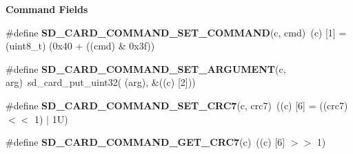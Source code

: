 \begin{Indent}\textbf{ Command Fields}\par
\begin{DoxyCompactItemize}
\item 
\mbox{\label{spi-sd-card_8c_af026546f270572d99efe2a6281298aaf}} 
\#define {\bfseries S\+D\+\_\+\+C\+A\+R\+D\+\_\+\+C\+O\+M\+M\+A\+N\+D\+\_\+\+S\+E\+T\+\_\+\+C\+O\+M\+M\+A\+ND}(c,  cmd)~(c) \mbox{[}1\mbox{]} = (uint8\+\_\+t) (0x40 + ((cmd) \& 0x3f))
\item 
\mbox{\label{spi-sd-card_8c_a805da41615ddd44bf9e5d8023276c313}} 
\#define {\bfseries S\+D\+\_\+\+C\+A\+R\+D\+\_\+\+C\+O\+M\+M\+A\+N\+D\+\_\+\+S\+E\+T\+\_\+\+A\+R\+G\+U\+M\+E\+NT}(c,  arg)~sd\+\_\+card\+\_\+put\+\_\+uint32( (arg), \&((c) \mbox{[}2\mbox{]}))
\item 
\mbox{\label{spi-sd-card_8c_add08712f7489870b770142c9b6c1c761}} 
\#define {\bfseries S\+D\+\_\+\+C\+A\+R\+D\+\_\+\+C\+O\+M\+M\+A\+N\+D\+\_\+\+S\+E\+T\+\_\+\+C\+R\+C7}(c,  crc7)~((c) \mbox{[}6\mbox{]} = ((crc7) $<$$<$ 1) $\vert$ 1\+U)
\item 
\mbox{\label{spi-sd-card_8c_a4c0f5bfac1dcc7c536b9d504a00909da}} 
\#define {\bfseries S\+D\+\_\+\+C\+A\+R\+D\+\_\+\+C\+O\+M\+M\+A\+N\+D\+\_\+\+G\+E\+T\+\_\+\+C\+R\+C7}(c)~((c) \mbox{[}6\mbox{]} $>$$>$ 1)
\end{DoxyCompactItemize}
\end{Indent}
